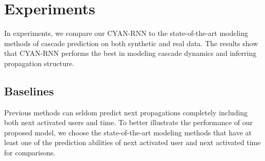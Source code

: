 \section{Experiments}
\label{sec:exp}
In experiments, we compare our CYAN-RNN 
to the state-of-the-art modeling methods of cascade prediction on both
synthetic and real data. 
The results show that CYAN-RNN performs the best in modeling cascade dynamics
and inferring propagation structure.

\subsection{Baselines}

Previous methods can seldom predict next propagations completely including both next
activated users and time. To better illustrate the performance of our
proposed model, we choose the state-of-the-art modeling methods that have at
least one of the prediction abilities of 
next activated user and next activated time for
comparisons. 

